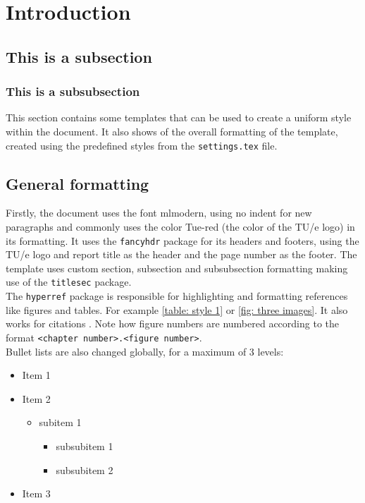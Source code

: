 \section{Introduction} 
\subsection{This is a subsection}

\subsubsection{This is a subsubsection}
This section contains some templates that can be used to create a uniform style within the document. It also shows of the overall formatting of the template, created using the predefined styles from the \texttt{settings.tex} file.

\subsection{General formatting}
Firstly, the document uses the font mlmodern, using no indent for new paragraphs and commonly uses the color \textcolor{Tue-red}{Tue-red} (the color of the TU/e logo) in its formatting. It uses the \texttt{fancyhdr} package for its headers and footers, using the TU/e logo and report title as the header and the page number as the footer. The template uses custom section, subsection and subsubsection formatting making use of the \texttt{titlesec} package.\\
The \texttt{hyperref} package is responsible for highlighting and formatting references like figures and tables. For example \cref{table: style 1} or \cref{fig: three images}. It also works for citations \cite{texbook}. Note how figure numbers are numbered according to the format \texttt{<chapter number>.<figure number>}.\\

Bullet lists are also changed globally, for a maximum of 3 levels:

\begin{itemize}
    \item Item 1
    \item Item 2
    \begin{itemize}
        \item subitem 1
        \begin{itemize}
            \item subsubitem 1
            \item subsubitem 2
        \end{itemize}
    \end{itemize}
    \item Item 3
\end{itemize}

